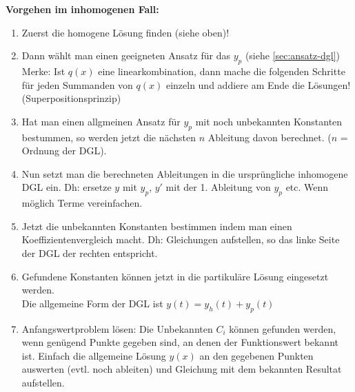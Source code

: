 \textbf{\textbf{Vorgehen im inhomogenen Fall:}}
\begin{enumerate}
	\item Zuerst die homogene Lösung finden (siehe oben)!

	\item Dann wählt man einen geeigneten Ansatz für das $y_p$ (siehe \ref{sec:ansatz-dgl})\\
	Merke: Ist $q(x)$ eine linearkombination, dann mache die folgenden Schritte für jeden Summanden von $q(x)$ einzeln und addiere am Ende die Lösungen! (Superpositionsprinzip)

	\item Hat man einen allgmeinen Ansatz für $y_p$ mit noch unbekannten Konstanten bestummen, so werden jetzt die nächsten $n$ Ableitung davon berechnet. ($n$ = Ordnung der DGL). 

	\item Nun setzt man die berechneten Ableitungen in die ursprüngliche inhomogene DGL ein. Dh: ersetze $y$ mit $y_p$, $y'$ mit der 1. Ableitung von $y_p$ etc. Wenn möglich Terme vereinfachen.

	\item Jetzt die unbekannten Konstanten bestimmen indem man einen Koeffizientenvergleich macht. Dh: Gleichungen aufstellen, so das linke Seite der DGL der rechten entspricht. 

	\item Gefundene Konstanten können jetzt in die partikuläre Lösung eingesetzt werden.\\
	Die allgemeine Form der DGL ist $y(t) = y_h(t) + y_p(t)$

	\item Anfangswertproblem lösen: Die Unbekannten $C_i$ können gefunden werden, wenn genügend Punkte gegeben sind, an denen der Funktionswert bekannt ist. Einfach die allgemeine Lösung $y(x)$ an den gegebenen Punkten auswerten (evtl. noch ableiten) und Gleichung mit dem bekannten Resultat aufstellen.
\end{enumerate}

